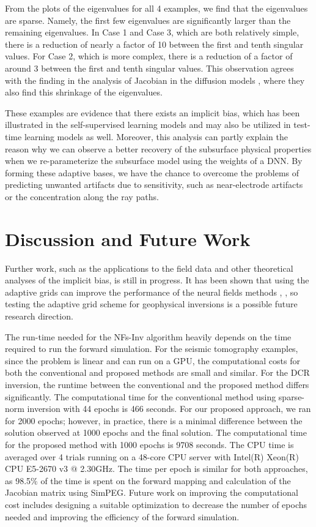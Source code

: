 \documentclass[lettersize,journal]{IEEEtran}
\begin{document}
From the plots of the eigenvalues for all 4 examples, we find that the eigenvalues are sparse. Namely, the first few eigenvalues are significantly larger than the remaining eigenvalues. In Case 1 and Case 3, which are both relatively simple, there is a reduction of nearly a factor of 10 between the first and tenth singular values. For Case 2, which is more complex, there is a reduction of a factor of around 3 between the first and tenth singular values. This observation agrees with the finding in the analysis of Jacobian in the diffusion models \cite{Zahra}, where they also find this shrinkage of the eigenvalues.

These examples are evidence that there exists an implicit bias, which has been illustrated in the self-supervised learning models and may also be utilized in test-time learning models as well. Moreover, this analysis can partly explain the reason why we can observe a better recovery of the subsurface physical properties when we re-parameterize the subsurface model using the weights of a DNN. By forming these adaptive bases, we have the chance to overcome the problems of predicting unwanted artifacts due to sensitivity, such as near-electrode artifacts or the concentration along the ray paths.

\section{Discussion and Future Work}

Further work, such as the applications to the field data and other theoretical analyses of the implicit bias, is still in progress. It has been shown that using the adaptive grids can improve the performance of the neural fields methods \cite{martel2021acornadaptivecoordinatenetworks}, \cite{10.1145/3503250}, so testing the adaptive grid scheme for geophysical inversions is a possible future research direction.

The run-time needed for the NFs-Inv algorithm heavily depends on the time required to run the forward simulation. For the seismic tomography examples, since the problem is linear and can run on a GPU, the computational costs for both the conventional and proposed methods are small and similar. For the DCR inversion, the runtime between the conventional and the proposed method differs significantly. The computational time for the conventional method using sparse-norm inversion with 44 epochs is 466 seconds. For our proposed approach, we ran for 2000 epochs; however, in practice, there is a minimal difference between the solution observed at 1000 epochs and the final solution. The computational time for the proposed method with 1000 epochs is 9708 seconds. The CPU time is averaged over 4 trials running on a 48-core CPU server with Intel(R) Xeon(R) CPU E5-2670 v3 $@$ 2.30GHz. The time per epoch is similar for both approaches, as 98.5$\%$ of the time is spent on the forward mapping and calculation of the Jacobian matrix using SimPEG. Future work on improving the computational cost includes designing a suitable optimization to decrease the number of epochs needed and improving the efficiency of the forward simulation. 
\end{document}
